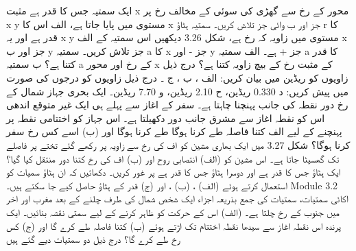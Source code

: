 
 ایک سمتیہ جس کا قدر     ہے مثبت x محور کے رخ سے گھڑی کی سوئی کے مخالف رخ     پر x y مستوی میں پایا جاتا ہے،  الف اس کا x جز اور ب  وائی جز تلاش کریں۔   
 سمتیہ ہٹاؤ r کا قدر     ہے اور یہ x y  مستوی میں زاویہ    کہ رخ ہے، شکل 3.26 دیکھیں اس سمتیہ کے الف x جز اور  ب y جز تلاش کریں۔  
  سمتیہ a کا x جز -    اور y جز +    ہے۔  الف سمتیہ a کا قدر کتنا ہے؟  ب سمتیہ a کے رخ اور محور x کے مثبت رخ کے بیچ زاویہ کتنا ہے؟   
  درج ذیل زاویوں کو ریڈین میں بیان کریں: الف   ، ب  ، ج  ۔ درج ذیل زاویوں کو درجوں کی صورت میں پیش کریں: د 0.330 ریڈین،  ح 2.10 ریڈین، و 7.70 ریڈین۔  
  ایک بحری جہاز شمال کے رخ    دور نقطہ کی جانب پہنچنا چاہتا ہے۔ سفر کے اغاز سے پہلے ہی ایک غیر متوقع اندھی اس کو نقطہ اغاز سے مشرق جانب     دور دکھیلتا ہے۔ اس جہاز کو اختتامی نقطہ پر پہنچنے کے لیے الف کتنا فاصلہ طے کرنا ہوگا طے کرنا ہوگا اور (ب) اسے کس رخ سفر کرنا ہوگا؟  
 شکل 3.27 میں ایک بھاری مشین کو اف کی رخ سے زاویہ   پر رکھے گئے تختے پر   فاصلے تک گھسیٹا جاتا ہے۔ اس مشین کو (الف) انتصابی روح اور  (ب) اف کی رخ کتنا دور منتقل کیا گیا؟   
 ایک ہٹاؤ جس کا قدر    ہے اور دوسرا ہٹاؤ جس کا قدر    ہے پر غور کریں۔ دکھائیں کہ ان ہٹاؤ سمیات کو استعمال کرتے ہوئے  (الف)    ، (ب)   ، اور (ج)  قدر کے ہٹاؤ حاصل کیے جا سکتے ہیں۔ Module 3.2  اکائی سمتیات، سمتیات کی جمع بذریعہ اجزاء   
 ایک شخص   شمال کی طرف چلنے کے بعد   مغرب اور اخر میں    جنوب کے رخ چلتا ہے۔ (الف) اس کے حرکت کو ظاہر کرنے کے لیے سمتی نقشہ بنائیں۔ ایک پرندہ اس نقطہ اغاز سے سیدھا نقطہ اختتام تک اڑتے ہوئے  (ب) کتنا فاصلہ طے کرے گا اور  (ج) کس رخ طے کرے گا؟   
 درج ذیل دو سمتیات دیے گئے ہیں
